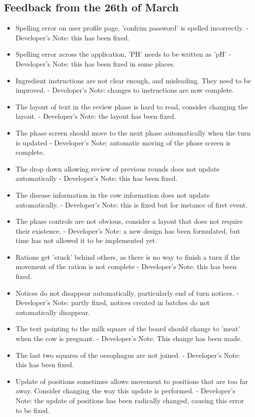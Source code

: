 \subsection{Feedback from the 26th of March}
\begin{itemize}
	\item Spelling error on user profile page, 'confrim password' is spelled incorrectly. - Developer's Note: this has been fixed.
	\item Spelling error across the application, 'PH' needs to be written as 'pH' - Developer's Note: this has been fixed in some places.
	\item Ingredient instructions are not clear enough, and misleading. They need to be improved. - Developer's Note: changes to instructions are now complete.
	\item The layout of text in the review phase is hard to read, consider changing the layout. - Developer's Note: the layout has been fixed.
	\item The phase screen should move to the next phase automatically when the turn is updated - Developer's Note: automatic moving of the phase screen is complete.
	\item The drop down allowing review of previous rounds does not update automatically - Developer's Note: this has been fixed.
	\item The disease information in the cow information does not update automatically. - Developer's Note: this is fixed but for instance of first event.
	\item The phase controls are not obvious, consider a layout that does not require their existence. - Developer's Note: a new design has been formulated, but time has not allowed it to be implemented yet.
	\item Rations get 'stuck' behind others, as there is no way to finish a turn if the movement of the ration is not complete - Developer's Note: this has been fixed.
	\item Notices do not disappear automatically, particularly end of turn notices. - Developer's Note: partly fixed, notices created in batches do not automatically disappear.
	\item The text pointing to the milk square of the board should change to 'meat' when the cow is pregnant. - Developer's Note: This change has been made.
	\item The last two squares of the oesophagus are not joined. - Developer's Note: this has been fixed.
	\item Update of positions sometimes allows movement to positions that are too far away. Consider changing the way this update is performed. - Developer's Note: the update of positions has been radically changed, causing this error to be fixed.

\end{itemize}
